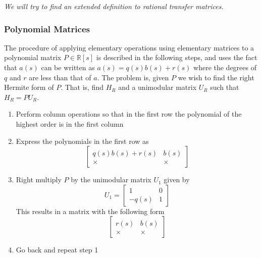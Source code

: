 \textit{We will try to find an extended definition to rational transfer matrices.}

\subsubsection{Polynomial Matrices}

The procedure of applying elementary operations using elementary matrices to a polynomial matrix $P\in\mathbb{R}[s]$ is described in the following steps, and uses the fact that $a(s)$ can be written as $a(s)=q(s)b(s)+r(s)$ where the degrees of $q$ and $r$ are less than that of $a$.
The problem is, given $P$ we wish to find the right Hermite form of $P$.
That is, find $H_{R}$ and a unimodular matrix $U_{R}$ such that $H_{R}=PU_{R}$.

\begin{enumerate}
  \item{Perform column operations so that in the first row the polynomial of the highest order is in the first column}
  \item{Express the polynomials in the first row as}
  \begin{equation*}
    \begin{bmatrix}
      q(s)b(s)+r(s) & b(s) \\
      \times & \times
    \end{bmatrix}
  \end{equation*}
  \item{Right multiply $P$ by the unimodular matrix $U_{1}$ given by}
  \begin{equation*}
    U_{1}=
    \begin{bmatrix}
      1 & 0 \\
      -q(s) & 1
    \end{bmatrix}
  \end{equation*}
  This results in a matrix with the following form
  \begin{equation*}
    \begin{bmatrix}
      r(s) & b(s) \\
      \times & \times
    \end{bmatrix}
  \end{equation*}
  \item{Go back and repeat step 1}
\end{enumerate}


